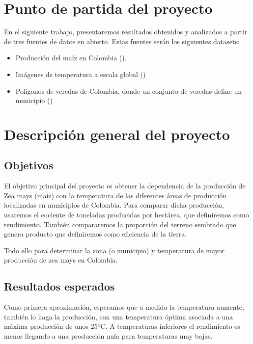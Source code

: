 \documentclass[12pt, spanish]{article}
\begin{document}
\newpage
{}
\setcounter{page}{1}

\section{Punto de partida del proyecto}

En el siguiente trabajo, presentaremos resultados obtenidos y analizados a partir de tres fuentes de datos en abierto. Estas fuentes serán los siguientes datasets:

\begin{itemize}
    \item Producción del maíz en Colombia (\cite{GobiernodeColombia2018}).
    
    \item Imágenes de temperatura a escala global (\cite{NASALPDAACattheUSGSEROSCenter2019})
    
    \item Polígonos de veredas de Colombia, donde un conjunto de veredas define un municipio (\cite{DANECOL2017})
\end{itemize}


\section{Descripción general del proyecto}

\subsection{Objetivos}

El objetivo principal del proyecto es obtener la dependencia de la producción de Zea mays (maíz) con la temperatura de las diferentes áreas de producción localizadas en municipios de Colombia. Para comparar dicha producción, usaremos el cociente de toneladas producidas por hectárea, que definiremos como rendimiento. También compararemos la proporción del terreno sembrado que genera producto que definiremos como eficiencia de la tierra.

Todo ello para determinar la zona (o municipio) y temperatura de mayor producción de zea mays en Colombia.

\subsection{Resultados esperados}
Como primera aproximación, esperamos que a medida la temperatura aumente, también lo haga la producción, con una temperatura óptima asociada a una máxima producción de unos 25ºC. A temperaturas inferiores el rendimiento es menor llegando a una producción nula para temperaturas muy bajas.
\end{document}
